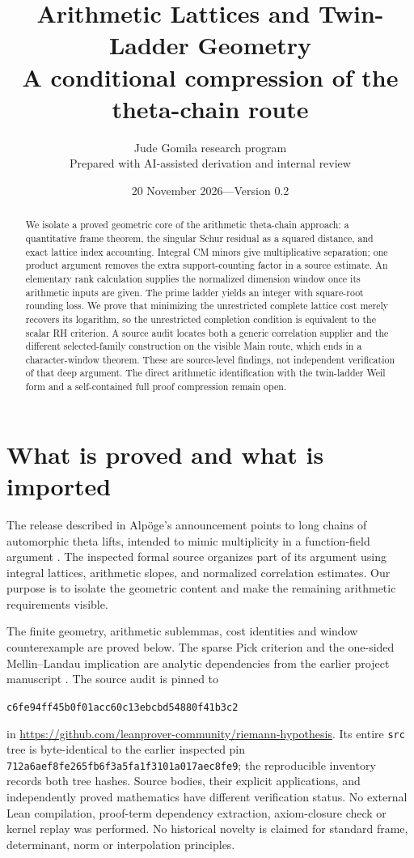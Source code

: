 \documentclass[11pt,letterpaper]{article}
\title{\textbf{Arithmetic Lattices and Twin-Ladder Geometry}\\[0.35em]\large A conditional compression of the theta-chain route}
\author{Jude Gomila research program\\\small Prepared with AI-assisted derivation and internal review}
\date{20 November 2026\quad---\quad Version 0.2}
\theoremstyle{definition}
\theoremstyle{remark}
\numberwithin{equation}{section}
\begin{document}
\maketitle
\begin{abstract}
We isolate a proved geometric core of the arithmetic theta-chain approach: a quantitative frame theorem, the singular Schur residual as a squared distance, and exact lattice index accounting. Integral CM minors give multiplicative separation; one product argument removes the extra support-counting factor in a source estimate. An elementary rank calculation supplies the normalized dimension window once its arithmetic inputs are given. The prime ladder yields an integer with square-root rounding loss. We prove that minimizing the unrestricted complete lattice cost merely recovers its logarithm, so the unrestricted completion condition is equivalent to the scalar RH criterion. A source audit locates both a generic correlation supplier and the different selected-family construction on the visible Main route, which ends in a character-window theorem. These are source-level findings, not independent verification of that deep argument. The direct arithmetic identification with the twin-ladder Weil form and a self-contained full proof compression remain open.
\end{abstract}

\section{What is proved and what is imported}

The release described in Alp\"oge's announcement points to long chains of automorphic theta lifts, intended to mimic multiplicity in a function-field argument \cite{announcement}. The inspected formal source organizes part of its argument using integral lattices, arithmetic slopes, and normalized correlation estimates. Our purpose is to isolate the geometric content and make the remaining arithmetic requirements visible.

The finite geometry, arithmetic sublemmas, cost identities and window counterexample are proved below. The sparse Pick criterion and the one-sided Mellin--Landau implication are analytic dependencies from the earlier project manuscript \cite{project}. The source audit is pinned to
\begin{center}\small\texttt{c6fe94ff45b0f01acc60c13ebcbd54880f41b3c2}\end{center}
in \url{https://github.com/leanprover-community/riemann-hypothesis}. Its entire \texttt{src} tree is byte-identical to the earlier inspected pin \texttt{712a6aef8fe265fb6f3a5fa1f3101a017aec8fe9}; the reproducible inventory records both tree hashes. Source bodies, their explicit applications, and independently proved mathematics have different verification status. No external Lean compilation, proof-term dependency extraction, axiom-closure check or kernel replay was performed. No historical novelty is claimed for standard frame, determinant, norm or interpolation principles.
\end{document}
